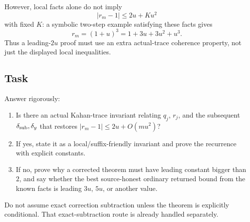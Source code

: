 \documentclass{article}
\begin{document}
However, local facts alone do not imply
\[
  |r_m-1|\le 2u+K u^2
\]
with fixed \(K\): a symbolic two-step example satisfying these facts gives
\[
  r_m=(1+u)^3=1+3u+3u^2+u^3.
\]
Thus a leading-\(2u\) proof must use an extra actual-trace coherence property,
not just the displayed local inequalities.

\subsection*{Task}

Answer rigorously:

\begin{enumerate}
\item Is there an actual Kahan-trace invariant relating \(q_j\), \(r_j\), and
      the subsequent \(\delta_{\rm sub},\delta_y\) that restores
      \(|r_m-1|\le 2u+O(mu^2)\)?
\item If yes, state it as a local/suffix-friendly invariant and prove the
      recurrence with explicit constants.
\item If no, prove why a corrected theorem must have leading constant bigger
      than \(2\), and say whether the best source-honest ordinary returned
      bound from the known facts is leading \(3u\), \(5u\), or another value.
\end{enumerate}

Do not assume exact correction subtraction unless the theorem is explicitly
conditional.  That exact-subtraction route is already handled separately.
\end{document}
